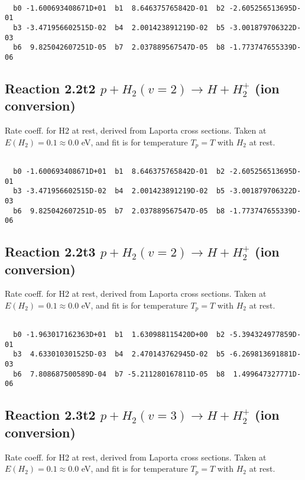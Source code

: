 \begin{small}\begin{verbatim}

  b0 -1.600693408671D+01  b1  8.646375765842D-01  b2 -2.605256513695D-01
  b3 -3.471956602515D-02  b4  2.001423891219D-02  b5 -3.001879706322D-03
  b6  9.825042607251D-05  b7  2.037889567547D-05  b8 -1.773747655339D-06

\end{verbatim}\end{small}

\newpage
\subsection{
Reaction 2.2t2
$ p + H_2(v=2) \rightarrow H + H_2^+$ (ion conversion)
}
Rate coeff. for H2 at rest, derived from Laporta cross sections.
Taken at $E(H_2) = 0.1 \approx 0.0$ eV,  and fit is for temperature $T_p=T$ with $H_2$ at rest.

\begin{small}\begin{verbatim}

  b0 -1.600693408671D+01  b1  8.646375765842D-01  b2 -2.605256513695D-01
  b3 -3.471956602515D-02  b4  2.001423891219D-02  b5 -3.001879706322D-03
  b6  9.825042607251D-05  b7  2.037889567547D-05  b8 -1.773747655339D-06

\end{verbatim}\end{small}

\newpage
\subsection{
Reaction 2.2t3
$ p + H_2(v=2) \rightarrow H + H_2^+$ (ion conversion)
}
Rate coeff. for H2 at rest, derived from Laporta cross sections.
Taken at $E(H_2) = 0.1 \approx 0.0$ eV,  and fit is for temperature $T_p=T$ with $H_2$ at rest.

\begin{small}\begin{verbatim}

  b0 -1.963017162363D+01  b1  1.630988115420D+00  b2 -5.394324977859D-01
  b3  4.633010301525D-03  b4  2.470143762945D-02  b5 -6.269813691881D-03
  b6  7.808687500589D-04  b7 -5.211280167811D-05  b8  1.499647327771D-06

\end{verbatim}\end{small}

\newpage
\subsection{
Reaction 2.3t2
$ p + H_2(v=3) \rightarrow H + H_2^+$ (ion conversion)
}
Rate coeff. for H2 at rest, derived from Laporta cross sections.
Taken at $E(H_2) = 0.1 \approx 0.0$ eV,  and fit is for temperature $T_p=T$ with $H_2$ at rest.

